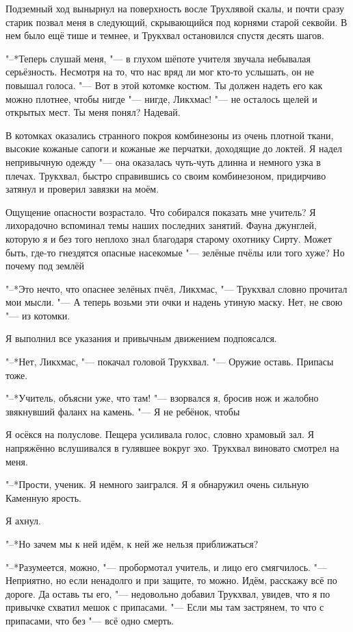 \documentclass[a4paper,10pt]{book}
\newcommand{\ldotst}{\so{...}\xspace}
\newcommand{\ldotsq}{\so{?\hbox{\hspace{-.212em}}..}\xspace}
\begin{document}
Подземный ход вынырнул на поверхность восле Трухлявой скалы, и почти сразу 
старик позвал меня в следующий, скрывающийся под корнями старой секвойи. В нем 
было ещё тише и темнее, и Трукхвал остановился спустя десять шагов.

"--*Теперь слушай меня, "--- в глухом шёпоте учителя звучала небывалая 
серьёзность. Несмотря на то, что нас вряд ли мог кто-то услышать, он не повышал 
голоса. "--- Вот в этой котомке костюм. Ты должен надеть его как можно плотнее, 
чтобы нигде "--- нигде, Ликхмас! "--- не осталось щелей и открытых мест. Ты 
меня понял? Надевай.

В котомках оказались странного покроя комбинезоны из очень плотной ткани, 
высокие кожаные сапоги и кожаные же перчатки, доходящие до локтей. Я надел 
непривычную одежду "--- она оказалась чуть-чуть длинна и немного узка в плечах. 
Трукхвал, быстро справившись со своим комбинезоном, придирчиво затянул и 
проверил завязки на моём.

Ощущение опасности возрастало. Что собирался показать мне учитель? Я 
лихорадочно вспоминал темы наших последних занятий. Фауна джунглей, которую я и 
без того неплохо знал благодаря старому охотнику Сирту. Может быть, где-то 
гнездятся опасные насекомые "--- зелёные пчёлы или того хуже? Но почему под 
землёй\ldotsq

"--*Это нечто, что опаснее зелёных пчёл, Ликхмас, "--- Трукхвал словно прочитал 
мои мысли. "--- А теперь возьми эти очки и надень утиную маску. Нет, не свою 
"--- из котомки.

Я выполнил все указания и привычным движением подпоясался.

"--*Нет, Ликхмас, "--- покачал головой Трукхвал. "--- Оружие оставь. Припасы 
тоже.

"--*Учитель, объясни уже, что там! "--- взорвался я, бросив нож и жалобно 
звякнувший фаланх на камень. "--- Я не ребёнок, чтобы\ldotst

Я осёкся на полуслове. Пещера усиливала голос, словно храмовый зал. Я 
напряжённо вслушивался в гулявшее вокруг эхо. Трукхвал виновато смотрел на меня.

"--*Прости, ученик. Я немного заигрался. Я\ldotst я обнаружил очень сильную 
Каменную ярость.

Я ахнул.

"--*Но зачем мы к ней идём, к ней же нельзя приближаться?

"--*Разумеется, можно, "--- пробормотал учитель, и лицо его смягчилось. "--- 
Неприятно, но если ненадолго и при защите, то можно. Идём, расскажу всё по 
дороге. Да оставь ты его, "--- недовольно добавил Трукхвал, увидев, что я по 
привычке схватил мешок с припасами. "--- Если мы там застрянем, то что с 
припасами, что без "--- всё одно смерть.
\end{document}

